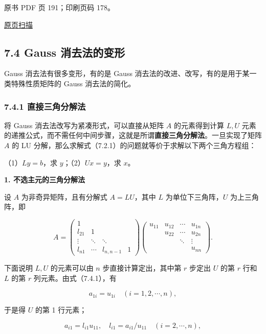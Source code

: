 \clearpage

原书 PDF 页 191；印刷页码 178。

\href{source-images/pdf-191.jpeg}{原页扫描}

\subsection{7.4 Gauss 消去法的变形}\label{ch07a-gauss-ux6d88ux53bbux6cd5ux7684ux53d8ux5f62}

Gauss 消去法有很多变形，有的是 Gauss 消去法的改进、改写，有的是用于某一类特殊性质矩阵的 Gauss 消去法的简化。

\subsubsection{7.4.1 直接三角分解法}\label{ch07a-ux76f4ux63a5ux4e09ux89d2ux5206ux89e3ux6cd5}

将 Gauss 消去法改写为紧凑形式，可以直接从矩阵 \(A\) 的元素得到计算 \(L,U\) 元素的递推公式，而不需任何中间步骤，这就是所谓\textbf{直接三角分解法}。一旦实现了矩阵 \(A\) 的 LU 分解，那么求解式（7.2.1）的问题就等价于求解以下两个三角方程组：

（1）\(Ly=b\)，求 \(y\)；（2）\(Ux=y\)，求 \(x\)。

\textbf{1. 不选主元的三角分解法}

设 \(A\) 为非奇异矩阵，且有分解式 \(A=LU\)，其中 \(L\) 为单位下三角阵，\(U\) 为上三角阵，即

\[
A=\begin{pmatrix}
1&&&\\
l_{21}&1&&\\
\vdots&\ddots&\ddots&\\
l_{n1}&\cdots&l_{n,n-1}&1
\end{pmatrix}
\begin{pmatrix}
u_{11}&u_{12}&\cdots&u_{1n}\\
&u_{22}&\cdots&u_{2n}\\
&&\ddots&\vdots\\
&&&u_{nn}
\end{pmatrix}.
\tag{7.4.1}
\]

下面说明 \(L,U\) 的元素可以由 \(n\) 步直接计算定出，其中第 \(r\) 步定出 \(U\) 的第 \(r\) 行和 \(L\) 的第 \(r\) 列元素。由式（7.4.1），有

\[a_{1i}=u_{1i}\quad(i=1,2,\cdots,n),\]

于是得 \(U\) 的第 1 行元素；

\[a_{i1}=l_{i1}u_{11},\quad l_{i1}=a_{i1}/u_{11}\quad(i=2,\cdots,n),\]

